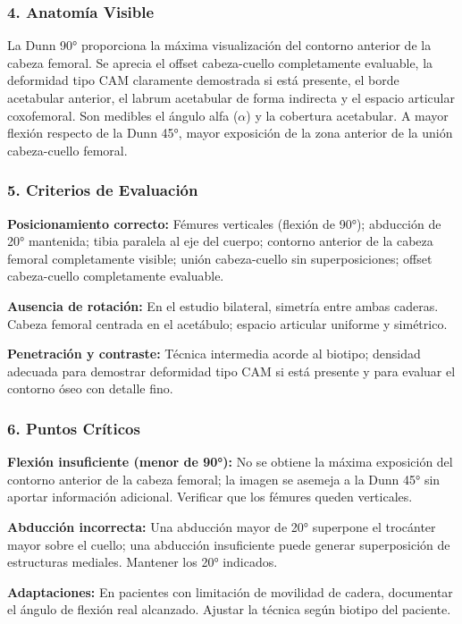 	\subsubsection*{4. Anatomía Visible}
	
	La Dunn 90° proporciona la máxima visualización del contorno anterior de la cabeza femoral. Se aprecia el offset cabeza-cuello completamente evaluable, la deformidad tipo CAM claramente demostrada si está presente, el borde acetabular anterior, el labrum acetabular de forma indirecta y el espacio articular coxofemoral. Son medibles el ángulo alfa ($\alpha$) y la cobertura acetabular. A mayor flexión respecto de la Dunn 45°, mayor exposición de la zona anterior de la unión cabeza-cuello femoral.
	
	\subsubsection*{5. Criterios de Evaluación}
	
	\textbf{Posicionamiento correcto:} Fémures verticales (flexión de 90°); abducción de 20° mantenida; tibia paralela al eje del cuerpo; contorno anterior de la cabeza femoral completamente visible; unión cabeza-cuello sin superposiciones; offset cabeza-cuello completamente evaluable.
	
	\textbf{Ausencia de rotación:} En el estudio bilateral, simetría entre ambas caderas. Cabeza femoral centrada en el acetábulo; espacio articular uniforme y simétrico.
	
	\textbf{Penetración y contraste:} Técnica intermedia acorde al biotipo; densidad adecuada para demostrar deformidad tipo CAM si está presente y para evaluar el contorno óseo con detalle fino.
	
	\subsubsection*{6. Puntos Críticos}
	
	\textbf{Flexión insuficiente (menor de 90°):} No se obtiene la máxima exposición del contorno anterior de la cabeza femoral; la imagen se asemeja a la Dunn 45° sin aportar información adicional. Verificar que los fémures queden verticales.
	
	\textbf{Abducción incorrecta:} Una abducción mayor de 20° superpone el trocánter mayor sobre el cuello; una abducción insuficiente puede generar superposición de estructuras mediales. Mantener los 20° indicados.
	
	\textbf{Adaptaciones:} En pacientes con limitación de movilidad de cadera, documentar el ángulo de flexión real alcanzado. Ajustar la técnica según biotipo del paciente.
	
